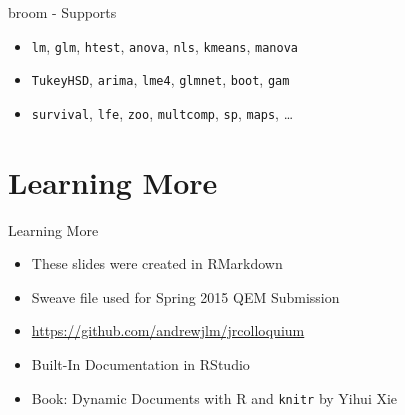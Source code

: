\begin{frame}{broom - Supports}

\begin{itemize}
\itemsep1pt\parskip0pt
\item
  \texttt{lm}, \texttt{glm}, \texttt{htest}, \texttt{anova},
  \texttt{nls}, \texttt{kmeans}, \texttt{manova}
\item
  \texttt{TukeyHSD}, \texttt{arima}, \texttt{lme4}, \texttt{glmnet},
  \texttt{boot}, \texttt{gam}
\item
  \texttt{survival}, \texttt{lfe}, \texttt{zoo}, \texttt{multcomp},
  \texttt{sp}, \texttt{maps}, \ldots
\end{itemize}

\end{frame}

\section{Learning More}\label{learning-more}

\begin{frame}{Learning More}

\begin{itemize}
\itemsep1pt\parskip0pt
\item
  These slides were created in RMarkdown
\item
  Sweave file used for Spring 2015 QEM Submission
\item
  \url{https://github.com/andrewjlm/jrcolloquium}
\item
  Built-In Documentation in RStudio
\item
  Book: Dynamic Documents with R and \texttt{knitr} by Yihui Xie
\end{itemize}

\end{frame}
